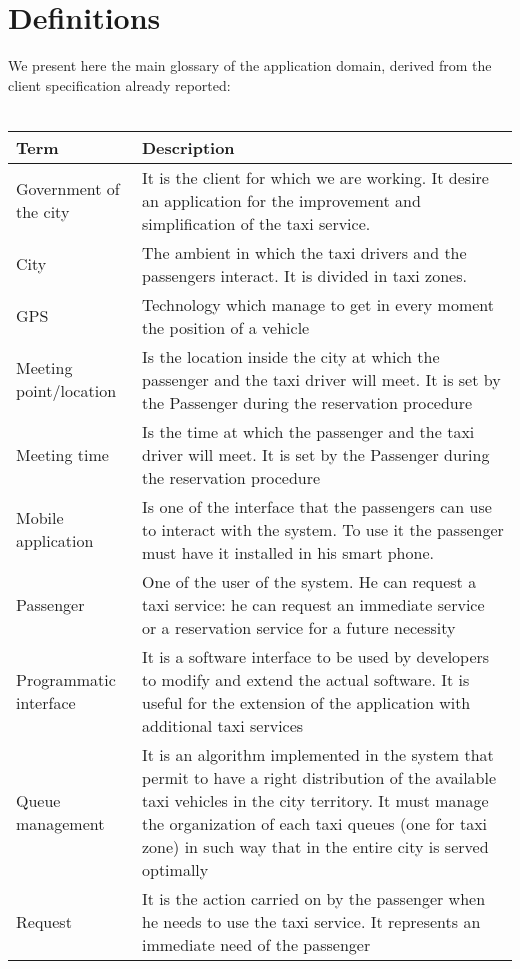 \section{Definitions}
We present here the main glossary of the application domain, derived from the client specification already reported: \\ \\
\begin{center}
\begin{longtable}{| p{} | p{} |} \hline
{\Large \textbf{Term}} & {\Large \textbf{Description}} \\ \hline
Government of the city & It is the client for which we are working.  It desire an application for the improvement and simplification of the taxi service. \\ \hline
City & The ambient in which the taxi drivers and the passengers interact. It is divided in taxi zones. \\ \hline
GPS & Technology which manage to get in every moment the position of a vehicle \\ \hline
Meeting point/location & Is the location inside the city at which the passenger and the taxi driver will meet. It is set by the Passenger during the reservation procedure \\ \hline
Meeting time & Is the time at which the passenger and the taxi driver will meet. It is set by the Passenger during the reservation procedure\\ \hline
Mobile application & Is one of the interface that the passengers can use to interact with the system. To use it the passenger must have it installed in his smart phone. \\ \hline
Passenger & One of the user of the system. He can request a taxi service: he can request an immediate service or a reservation service for a future necessity \\ \hline
Programmatic interface & It is a software interface to be used by developers to modify and extend the actual software. It is useful for the extension of the application with additional taxi services \\ \hline
Queue management & It is an algorithm implemented in the system that permit to have a right distribution of the available taxi vehicles in the city territory. It must manage the organization of each taxi queues (one for taxi zone) in such way that in the entire city is served optimally \\ \hline
Request & It is the action carried on by the passenger when he needs to use the taxi service. It represents an immediate need of the passenger \\ \hline

\end{longtable}
\end{center}
